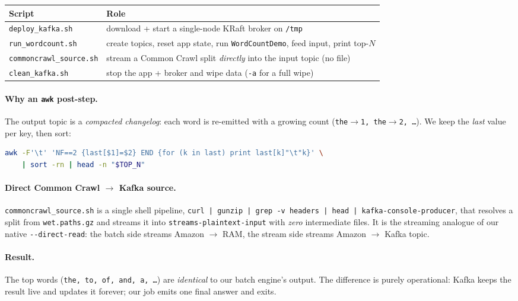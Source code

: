 \documentclass[11pt,a4paper]{article}
\newcommand{\code}[1]{\texttt{\small #1}}
\begin{document}
\begin{table}[H]
\centering
\small
\renewcommand{\arraystretch}{1.2}
\begin{tabularx}{\textwidth}{@{}lX@{}}
\toprule
\textbf{Script} & \textbf{Role}\\
\midrule
\code{deploy\_kafka.sh} & download + start a single-node KRaft broker on \code{/tmp}\\
\code{run\_wordcount.sh} & create topics, reset app state, run \code{WordCountDemo}, feed input, print top-$N$\\
\code{commoncrawl\_source.sh} & stream a Common Crawl split \emph{directly} into the input topic (no file)\\
\code{clean\_kafka.sh} & stop the app + broker and wipe data (\code{-a} for a full wipe)\\
\bottomrule
\end{tabularx}
\end{table}

\paragraph{Why an \code{awk} post-step.} The output topic is a \emph{compacted
changelog}: each word is re-emitted with a growing count
(\code{the$\to$1, the$\to$2, \dots}). We keep the \emph{last} value per key, then
sort:
\begin{lstlisting}[language=bash]
awk -F'\t' 'NF==2 {last[$1]=$2} END {for (k in last) print last[k]"\t"k}' \
    | sort -rn | head -n "$TOP_N"
\end{lstlisting}

\paragraph{Direct Common Crawl $\to$ Kafka source.}
\code{commoncrawl\_source.sh} is a single shell pipeline,
\code{curl | gunzip | grep -v headers | head | kafka-console-producer}, that
resolves a split from \code{wet.paths.gz} and streams it into
\code{streams-plaintext-input} with \emph{zero} intermediate files. It is the
streaming analogue of our native \code{-{}-direct-read}: the batch side streams
Amazon $\to$ RAM, the stream side streams Amazon $\to$ Kafka topic.

\paragraph{Result.} The top words (\code{the, to, of, and, a, \dots}) are
\emph{identical} to our batch engine's output. The difference is purely
operational: Kafka keeps the result live and updates it forever; our job emits
one final answer and exits.
\end{document}
